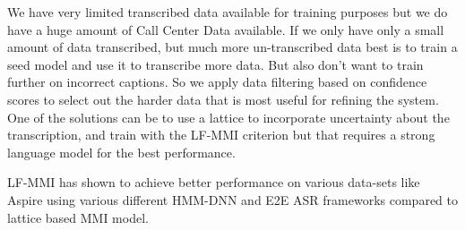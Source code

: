 We have very limited transcribed data available for training purposes but we do have a huge amount of Call Center Data available. If we only have only a small amount of data transcribed, but much more un-transcribed data best is to train a seed model and use it to transcribe more data. But also don't want to train further on incorrect captions. So we apply data filtering based on confidence scores to select out the harder data that is most useful for refining the system. One of the solutions can be \cite{ghahremani_investigation_2017} to use a lattice to incorporate uncertainty about the transcription, and train with the LF-MMI criterion but that requires a strong language model for the best performance\cite{wallington_learning_2021}.

LF-MMI has shown to achieve better performance on various data-sets like Aspire using various different HMM-DNN and E2E ASR frameworks \cite{ghahremani_investigation_2017, tian_consistent_2022} compared to lattice based MMI model.






